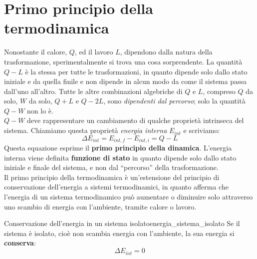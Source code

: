 \documentclass[12pt]{report}
\newcommand{\nmu}{}
\begin{document}
	\section{Primo principio della termodinamica}
	Nonostante il calore, $Q$, ed il lavoro $L$, dipendono dalla natura della trasformazione, sperimentalmente si trova una cosa sorprendente. La quantità $Q - L$ è la stessa per tutte le trasformazioni, in quanto dipende solo dallo stato iniziale e da quella finile e non dipende in alcun modo da come il sistema passa dall'uno all'altro. Tutte le altre combinazioni algebriche di $Q$ e $L$, compreso $Q$ da solo, $W$ da solo, $Q + L$ e $Q - 2L$, sono \textit{dipendenti dal percorso}; solo la quantità $Q - W$ non lo è. \\
	$Q - W$ deve rappresentare un cambiamento di qualche proprietà intrinseca del sistema. Chiamiamo questa proprietà \textit{energia interna } $E_{int}$ e scriviamo:
	\[
	\Delta E_{int} = E_{int, f} - E_{int, i} = Q - L
	\]
	Questa equazione esprime il \textbf{primo principio della dinamica}. L'energia interna viene definita \textbf{funzione di stato} in quanto dipende solo dallo stato iniziale e finale del sistema, e non dal ``percorso'' della trasformazione. \\
	Il primo principio della termodinamica è un'estensione del principio di conservazione dell'energia a sistemi termodinamici, in quanto afferma che l'energia di un sistema termodinamico può aumentare o diminuire solo attraverso uno scambio di energia con l'ambiente, tramite calore o lavoro.
	\begin{note}{\nmu Conservazione dell'energia in un sistema isolato}{energia_sistema_isolato}
		Se il sistema è isolato, cioè non scambia energia con l'ambiente, la sua energia si \textbf{conserva}:
		\[
		\Delta E_{int} = 0
		\]
	\end{note}
\end{document}
